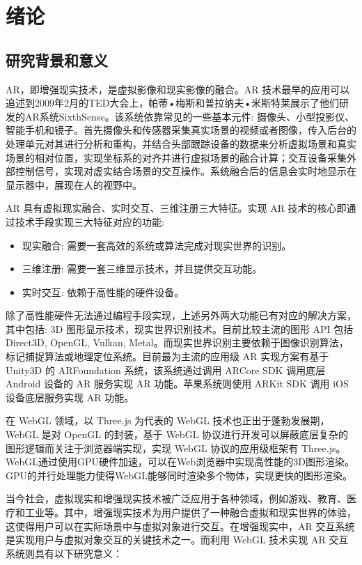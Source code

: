 \section{绪论}
\subsection{研究背景和意义}

AR，即增强现实技术，是虚拟影像和现实影像的融合。AR 技术最早的应用可以追述到2009年2月的TED大会上，帕蒂•梅斯和普拉纳夫•米斯特莱展示了他们研发的AR系统SixthSense\cite{SixthSense}。该系统依靠常见的一些基本元件: 摄像头、小型投影仪、智能手机和镜子。首先摄像头和传感器采集真实场景的视频或者图像，传入后台的处理单元对其进行分析和重构，并结合头部跟踪设备的数据来分析虚拟场景和真实场景的相对位置，实现坐标系的对齐并进行虚拟场景的融合计算；交互设备采集外部控制信号，实现对虚实结合场景的交互操作。系统融合后的信息会实时地显示在显示器中，展现在人的视野中。

AR 具有虚拟现实融合、实时交互、三维注册三大特征。实现 AR 技术的核心即通过技术手段实现三大特征对应的功能:
\begin{itemize}
  \item 现实融合: 需要一套高效的系统或算法完成对现实世界的识别。
  \item 三维注册: 需要一套三维显示技术，并且提供交互功能。
  \item 实时交互: 依赖于高性能的硬件设备。
\end{itemize}

除了高性能硬件无法通过编程手段实现，上述另外两大功能已有对应的解决方案，其中包括: 3D 图形显示技术，现实世界识别技术。目前比较主流的图形 API 包括 Direct3D, OpenGL, Vulkan, Metal。而现实世界识别主要依赖于图像识别算法，标记捕捉算法或地理定位系统。目前最为主流的应用级 AR 实现方案有基于 Unity3D 的 ARFoundation 系统，该系统通过调用 ARCore SDK 调用底层 Android 设备的 AR 服务实现 AR 功能\cite{ARFoundation}。苹果系统则使用 ARKit SDK 调用 iOS 设备底层服务实现 AR 功能。

在 WebGL 领域，以 Three.js 为代表的 WebGL 技术也正出于蓬勃发展期，WebGL 是对 OpenGL 的封装，基于 WebGL 协议进行开发可以屏蔽底层复杂的图形逻辑而关注于浏览器端实现，实现 WebGL 协议的应用级框架有 Three.js。WebGL通过使用GPU硬件加速，可以在Web浏览器中实现高性能的3D图形渲染。GPU的并行处理能力使得WebGL能够同时渲染多个物体，实现更快的图形渲染。

当今社会，虚拟现实和增强现实技术被广泛应用于各种领域，例如游戏、教育、医疗和工业等。其中，增强现实技术为用户提供了一种融合虚拟和现实世界的体验，这使得用户可以在实际场景中与虚拟对象进行交互。在增强现实中，AR 交互系统是实现用户与虚拟对象交互的关键技术之一。而利用 WebGL 技术实现 AR 交互系统则具有以下研究意义：


